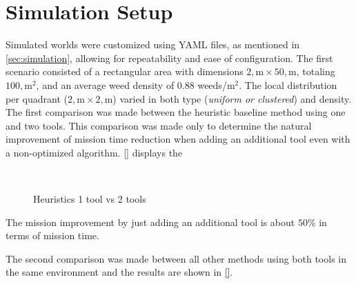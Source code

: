\section{Simulation Setup}
Simulated worlds were customized using YAML files, as mentioned in \autoref{sec:simulation}, allowing for repeatability and ease of configuration. The first scenario consisted of a rectangular area with dimensions $2,\text{m} \times 50,\text{m}$, totaling $100,\text{m}^2$, and an average weed density of $0.88$ weeds/m$^2$. The local distribution per quadrant ($2,\text{m} \times 2,\text{m}$) varied in both type (\textit{uniform or clustered}) and density. The first comparison was made between the heuristic baseline method using one and two tools. This comparison was made only to determine the natural improvement of mission time reduction when adding an additional tool even with a non-optimized algorithm. \autoref{} displays the 

\begin{figure}[htb]
    \myfloatalign
     \quad
     \\
    \caption{Heuristics 1 tool vs 2 tools}\label{fig:heuristic-1tools-vs-2tools}
\end{figure}

The mission improvement by just adding an additional tool is about $50\%$ in terms of mission time. 

The second comparison was made between all other methods using both tools in the same environment and the results are shown in \autoref{}.